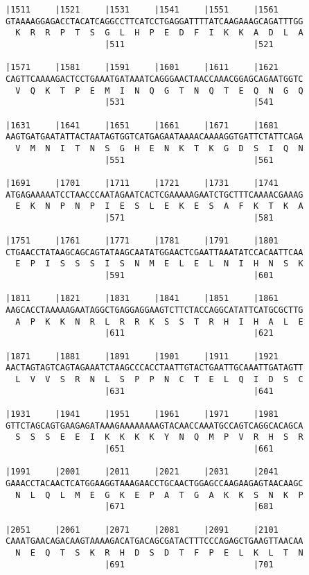 \documentclass{article}
\begin{document}
\begin{Verbatim}
|1511     |1521     |1531     |1541     |1551     |1561     
GTAAAAGGAGACCTACATCAGGCCTTCATCCTGAGGATTTTATCAAGAAAGCAGATTTGG
  K  R  R  P  T  S  G  L  H  P  E  D  F  I  K  K  A  D  L  A
                    |511                          |521      
  
|1571     |1581     |1591     |1601     |1611     |1621     
CAGTTCAAAAGACTCCTGAAATGATAAATCAGGGAACTAACCAAACGGAGCAGAATGGTC
  V  Q  K  T  P  E  M  I  N  Q  G  T  N  Q  T  E  Q  N  G  Q
                    |531                          |541      
  
|1631     |1641     |1651     |1661     |1671     |1681     
AAGTGATGAATATTACTAATAGTGGTCATGAGAATAAAACAAAAGGTGATTCTATTCAGA
  V  M  N  I  T  N  S  G  H  E  N  K  T  K  G  D  S  I  Q  N
                    |551                          |561      
  
|1691     |1701     |1711     |1721     |1731     |1741     
ATGAGAAAAATCCTAACCCAATAGAATCACTCGAAAAAGAATCTGCTTTCAAAACGAAAG
  E  K  N  P  N  P  I  E  S  L  E  K  E  S  A  F  K  T  K  A
                    |571                          |581      
  
|1751     |1761     |1771     |1781     |1791     |1801     
CTGAACCTATAAGCAGCAGTATAAGCAATATGGAACTCGAATTAAATATCCACAATTCAA
  E  P  I  S  S  S  I  S  N  M  E  L  E  L  N  I  H  N  S  K
                    |591                          |601      
  
|1811     |1821     |1831     |1841     |1851     |1861     
AAGCACCTAAAAAGAATAGGCTGAGGAGGAAGTCTTCTACCAGGCATATTCATGCGCTTG
  A  P  K  K  N  R  L  R  R  K  S  S  T  R  H  I  H  A  L  E
                    |611                          |621      
  
|1871     |1881     |1891     |1901     |1911     |1921     
AACTAGTAGTCAGTAGAAATCTAAGCCCACCTAATTGTACTGAATTGCAAATTGATAGTT
  L  V  V  S  R  N  L  S  P  P  N  C  T  E  L  Q  I  D  S  C
                    |631                          |641      
  
|1931     |1941     |1951     |1961     |1971     |1981     
GTTCTAGCAGTGAAGAGATAAAGAAAAAAAAGTACAACCAAATGCCAGTCAGGCACAGCA
  S  S  S  E  E  I  K  K  K  K  Y  N  Q  M  P  V  R  H  S  R
                    |651                          |661      
  
|1991     |2001     |2011     |2021     |2031     |2041     
GAAACCTACAACTCATGGAAGGTAAAGAACCTGCAACTGGAGCCAAGAAGAGTAACAAGC
  N  L  Q  L  M  E  G  K  E  P  A  T  G  A  K  K  S  N  K  P
                    |671                          |681      
  
|2051     |2061     |2071     |2081     |2091     |2101     
CAAATGAACAGACAAGTAAAAGACATGACAGCGATACTTTCCCAGAGCTGAAGTTAACAA
  N  E  Q  T  S  K  R  H  D  S  D  T  F  P  E  L  K  L  T  N
                    |691                          |701      
  

\end{Verbatim}
\end{document}
